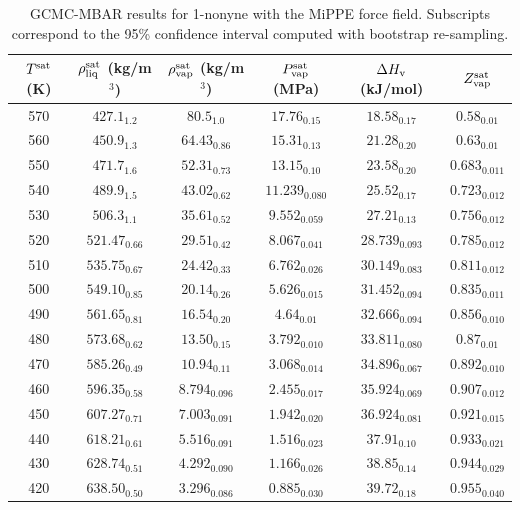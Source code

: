 \documentclass[journal=jctc,manuscript=article]{achemso}
\begin{document}
\begin{table}[htb!]
	\caption{GCMC-MBAR results for 1-nonyne with the MiPPE force field. Subscripts correspond to the 95\% confidence interval computed with bootstrap re-sampling.}
	\begin{center}
		\begin{tabular}{|c|c|c|c|c|c|}
			\hline
			$T^{\rm sat}$ (K) & $\rho_{\rm liq}^{\rm sat}$ (kg/m$^3$) & $\rho_{\rm vap}^{\rm sat}$ (kg/m$^3$) & $P_{\rm vap}^{\rm sat}$ (MPa) & $\Delta H_{\rm v}$ (kJ/mol) & $Z_{\rm vap}^{\rm sat}$ \\ \hline
			570 & $427.1_{1.2}$ & $80.5_{1.0}$ & $17.76_{0.15}$ & $18.58_{0.17}$ & $0.58_{0.01}$ \\
			560 & $450.9_{1.3}$ & $64.43_{0.86}$ & $15.31_{0.13}$ & $21.28_{0.20}$ & $0.63_{0.01}$ \\
			550 & $471.7_{1.6}$ & $52.31_{0.73}$ & $13.15_{0.10}$ & $23.58_{0.20}$ & $0.683_{0.011}$ \\
			540 & $489.9_{1.5}$ & $43.02_{0.62}$ & $11.239_{0.080}$ & $25.52_{0.17}$ & $0.723_{0.012}$ \\
			530 & $506.3_{1.1}$ & $35.61_{0.52}$ & $9.552_{0.059}$ & $27.21_{0.13}$ & $0.756_{0.012}$ \\
			520 & $521.47_{0.66}$ & $29.51_{0.42}$ & $8.067_{0.041}$ & $28.739_{0.093}$ & $0.785_{0.012}$ \\
			510 & $535.75_{0.67}$ & $24.42_{0.33}$ & $6.762_{0.026}$ & $30.149_{0.083}$ & $0.811_{0.012}$ \\
			500 & $549.10_{0.85}$ & $20.14_{0.26}$ & $5.626_{0.015}$ & $31.452_{0.094}$ & $0.835_{0.011}$ \\
			490 & $561.65_{0.81}$ & $16.54_{0.20}$ & $4.64_{0.01}$ & $32.666_{0.094}$ & $0.856_{0.010}$ \\
			480 & $573.68_{0.62}$ & $13.50_{0.15}$ & $3.792_{0.010}$ & $33.811_{0.080}$ & $0.87_{0.01}$ \\
			470 & $585.26_{0.49}$ & $10.94_{0.11}$ & $3.068_{0.014}$ & $34.896_{0.067}$ & $0.892_{0.010}$ \\
			460 & $596.35_{0.58}$ & $8.794_{0.096}$ & $2.455_{0.017}$ & $35.924_{0.069}$ & $0.907_{0.012}$ \\
			450 & $607.27_{0.71}$ & $7.003_{0.091}$ & $1.942_{0.020}$ & $36.924_{0.081}$ & $0.921_{0.015}$ \\
			440 & $618.21_{0.61}$ & $5.516_{0.091}$ & $1.516_{0.023}$ & $37.91_{0.10}$ & $0.933_{0.021}$ \\
			430 & $628.74_{0.51}$ & $4.292_{0.090}$ & $1.166_{0.026}$ & $38.85_{0.14}$ & $0.944_{0.029}$ \\
			420 & $638.50_{0.50}$ & $3.296_{0.086}$ & $0.885_{0.030}$ & $39.72_{0.18}$ & $0.955_{0.040}$ \\
			\hline
		\end{tabular}
	\end{center}
\end{table}
\end{document}

